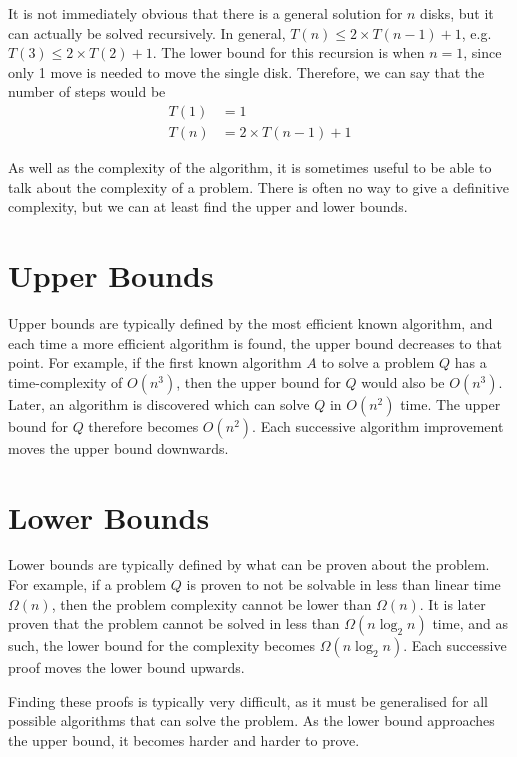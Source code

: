 It is not immediately obvious that there is a general solution for $n$ disks, but it can actually be solved recursively.
 In general, $T(n) \leq 2 \times T(n - 1) + 1$, e.g. $T(3) \leq 2 \times T(2) + 1$. The lower bound for this recursion
 is when $n = 1$, since only 1 move is needed to move the single disk. Therefore, we can say that the number of steps
 would be
\begin{align*}
  T(1) &= 1\\
  T(n) &= 2 \times T(n - 1) + 1
\end{align*}



As well as the complexity of the algorithm, it is sometimes useful to be able to talk about the complexity of a problem.
 There is often no way to give a definitive complexity, but we can at least find the upper and lower bounds.

\section*{Upper Bounds}

Upper bounds are typically defined by the most efficient known algorithm, and each time a more efficient algorithm is
 found, the upper bound decreases to that point. For example, if the first known algorithm $A$ to solve a problem $Q$
 has a time-complexity of $O(n^3)$, then the upper bound for $Q$ would also be $O(n^3)$. Later, an algorithm is
 discovered which can solve $Q$ in $O(n^2)$ time. The upper bound for $Q$ therefore becomes $O(n^2)$. Each successive
 algorithm improvement moves the upper bound downwards.

\section*{Lower Bounds}

Lower bounds are typically defined by what can be proven about the problem. For example, if a problem $Q$ is proven to
 not be solvable in less than linear time $\Omega(n)$, then the problem complexity cannot be lower than $\Omega(n)$.
 It is later proven that the problem cannot be solved in less than $\Omega(n \log_{2}{n})$ time, and as such, the lower
 bound for the complexity becomes $\Omega(n \log_{2}{n})$. Each successive proof moves the lower bound upwards.

Finding these proofs is typically very difficult, as it must be generalised for all possible algorithms that can solve
 the problem. As the lower bound approaches the upper bound, it becomes harder and harder to prove.

